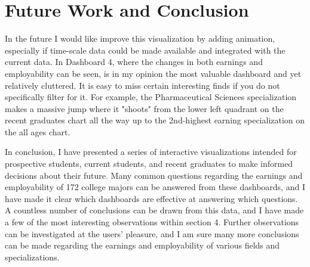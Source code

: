 \documentclass[sigchi]{acmart}
\providecommand\BibTeX{{%
    \normalfont B\kern-0.5em{\scshape i\kern-0.25em b}\kern-0.8em\TeX}}}
\begin{document}
\section{Future Work and Conclusion}
In the future I would like improve this visualization by adding animation, especially if time-scale data could be made available and integrated with the current data. In Dashboard 4, where the changes in both earnings and employability can be seen, is in my opinion the most valuable dashboard and yet relatively cluttered. It is easy to miss certain interesting finds if you do not specifically filter for it. For example, the Pharmaceutical Sciences specialization makes a massive jump where it "shoots" from the lower left quadrant on the recent graduates chart all the way up to the 2nd-highest earning specialization on the all ages chart.

In conclusion, I have presented a series of interactive visualizations intended for prospective students, current students, and recent graduates to make informed decisions about their future. Many common questions regarding the earnings and employability of 172 college majors can be answered from these dashboards, and I have made it clear which dashboards are effective at answering which questions. A countless number of conclusions can be drawn from this data, and I have made a few of the most interesting observations within section 4. Further observations can be investigated at the users' pleasure, and I am sure many more conclusions can be made regarding the earnings and employability of various fields and specializations. 




%   
%   
\end{document}
